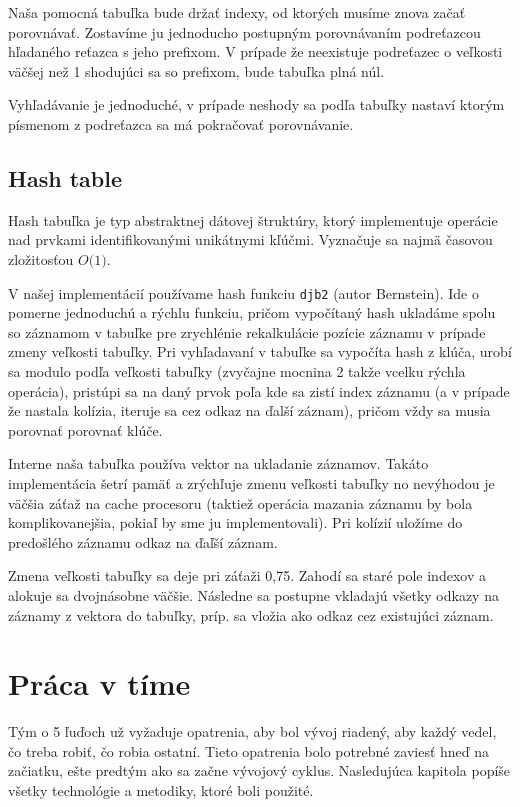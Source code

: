 \documentclass[12pt,a4paper,titlepage,final]{article}
\newcommand{\BigO}[1]{\ensuremath{O\bigl(#1\bigr)}}
\begin{document}
Naša pomocná tabuľka bude držať indexy, od ktorých musíme znova začať porovnávať.
 Zostavíme ju jednoducho postupným porovnávaním podreťazcou hľadaného reťazca s
 jeho prefixom. V prípade že neexistuje podreťazec o veľkosti väčšej než 1
 shodujúci sa so prefixom, bude tabuľka plná núl.

Vyhľadávanie je jednoduché, v prípade neshody sa podľa tabuľky nastaví ktorým
 písmenom z podreťazca sa má pokračovať porovnávanie.

\subsection{Hash table}
Hash tabuľka je typ abstraktnej dátovej štruktúry, ktorý implementuje operácie
 nad prvkami identifikovanými unikátnymi kľúčmi. Vyznačuje sa najmä časovou
 zložitosťou \BigO{1}.

 V našej implementácií používame hash funkciu \texttt{djb2} (autor Bernstein). Ide o
 pomerne jednoduchú a rýchlu funkciu, pričom vypočítaný hash ukladáme spolu so
 záznamom v tabuľke pre zrychlénie rekalkulácie pozície záznamu v prípade
 zmeny veľkosti tabuľky. Pri vyhľadavaní v tabuľke sa vypočíta hash z klúča,
 urobí sa modulo podľa veľkosti tabuľky (zvyčajne mocnina 2 takže vcelku rýchla
 operácia), pristúpi sa na daný prvok poľa kde sa zistí index záznamu (a v
 prípade že nastala kolízia, iteruje sa cez odkaz na ďalší záznam), pričom vždy
 sa musia porovnať porovnať klúče.

Interne naša tabuľka používa vektor na ukladanie záznamov. Takáto implementácia
 šetrí pamäť a zrýchľuje zmenu veľkosti tabuľky no nevýhodou je väčšia záťaž na
 cache procesoru (taktiež operácia mazania záznamu by bola komplikovanejšia,
 pokiaľ by sme ju implementovali). Pri kolízií uložíme do predošlého záznamu
 odkaz na ďaľší záznam.

Zmena veľkosti tabuľky sa deje pri záťaži 0,75. Zahodí sa staré pole indexov a
 alokuje sa dvojnásobne väčšie. Následne sa postupne vkladajú všetky odkazy na
 záznamy z vektora do tabuľky, príp. sa vložia ako odkaz cez existujúci záznam.

\section{Práca v tíme}
Tým o 5 ľuďoch už vyžaduje opatrenia, aby bol vývoj riadený, aby každý vedel, čo treba robiť,
čo robia ostatní. Tieto opatrenia bolo potrebné zaviesť hneď na začiatku, ešte predtým ako sa
začne vývojový cyklus. Nasledujúca kapitola popíše všetky technológie a metodiky, ktoré boli použité.
\end{document}
